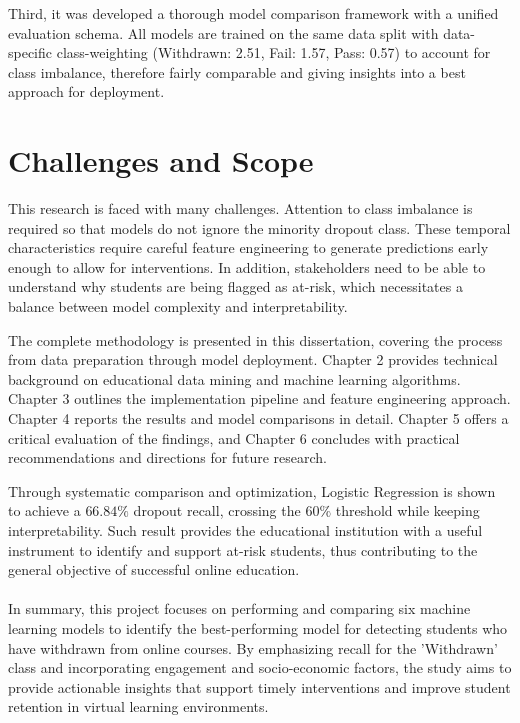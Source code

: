 \documentclass[ %
                    author={Carlos Duran Calle},
                supervisor={Dr. Felipe Campelo},
                    degree={MSc},
                     title={Comparative Machine Learning Analysis for Student Dropout Prediction in a Virtual Learning Environment},
                  subtitle={Incorporating Student Engagement and Socio-Economic Features},
                      type={},
                      year={2025}]{dissertation}
\begin{document}
Third, it was developed a thorough model comparison framework with a unified evaluation schema. All models are trained on the same data split with data-specific class-weighting (Withdrawn: 2.51, Fail: 1.57, Pass: 0.57) to account for class imbalance, therefore fairly comparable and giving insights into a best approach for deployment.

\section{Challenges and Scope}
This research is faced with many challenges. Attention to class imbalance is required so that models do not ignore the minority dropout class. These temporal characteristics require careful feature engineering to generate predictions early enough to allow for interventions. In addition, stakeholders need to be able to understand why students are being flagged as at-risk, which necessitates a balance between model complexity and interpretability.

The complete methodology is presented in this dissertation, covering the process from data preparation through model deployment. Chapter 2 provides technical background on educational data mining and machine learning algorithms. Chapter 3 outlines the implementation pipeline and feature engineering approach. Chapter 4 reports the results and model comparisons in detail. Chapter 5 offers a critical evaluation of the findings, and Chapter 6 concludes with practical recommendations and directions for future research.

Through systematic comparison and optimization, Logistic Regression is shown to achieve a $66.84\%$ dropout recall, crossing the $60\%$ threshold while keeping interpretability. Such result provides the educational institution with a useful instrument to identify and support at-risk students, thus contributing to the general objective of successful online education.

\paragraph{}
In summary, this project focuses on performing and comparing six machine learning models to identify the best-performing model for detecting students who have withdrawn from online courses. By emphasizing recall for the 'Withdrawn' class and incorporating engagement and socio-economic factors, the study aims to provide actionable insights that support timely interventions and improve student retention in virtual learning environments. 
\end{document}
